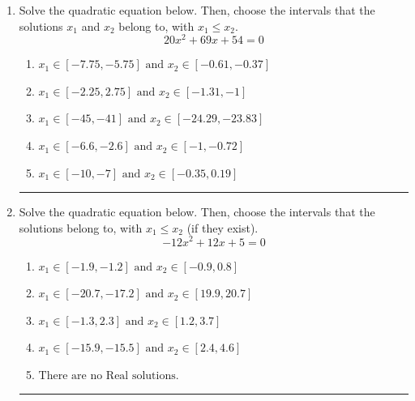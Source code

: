 \documentclass[14pt]{extbook}
\newcommand{\litem}[1]{\item#1\hspace*{-1cm}\rule{\textwidth}{0.4pt}}
\begin{document}
\begin{enumerate}
\litem{
Solve the quadratic equation below. Then, choose the intervals that the solutions $x_1$ and $x_2$ belong to, with $x_1 \leq x_2$.\[ 20x^{2} +69 x + 54 = 0 \]\begin{enumerate}[label=\Alph*.]
\item \( x_1 \in [-7.75, -5.75] \text{ and } x_2 \in [-0.61, -0.37] \)
\item \( x_1 \in [-2.25, 2.75] \text{ and } x_2 \in [-1.31, -1] \)
\item \( x_1 \in [-45, -41] \text{ and } x_2 \in [-24.29, -23.83] \)
\item \( x_1 \in [-6.6, -2.6] \text{ and } x_2 \in [-1, -0.72] \)
\item \( x_1 \in [-10, -7] \text{ and } x_2 \in [-0.35, 0.19] \)

\end{enumerate} }
\litem{
Solve the quadratic equation below. Then, choose the intervals that the solutions belong to, with $x_1 \leq x_2$ (if they exist).\[ -12x^{2} +12 x + 5 = 0 \]\begin{enumerate}[label=\Alph*.]
\item \( x_1 \in [-1.9, -1.2] \text{ and } x_2 \in [-0.9, 0.8] \)
\item \( x_1 \in [-20.7, -17.2] \text{ and } x_2 \in [19.9, 20.7] \)
\item \( x_1 \in [-1.3, 2.3] \text{ and } x_2 \in [1.2, 3.7] \)
\item \( x_1 \in [-15.9, -15.5] \text{ and } x_2 \in [2.4, 4.6] \)
\item \( \text{There are no Real solutions.} \)


\end{enumerate}}
\end{enumerate}
\end{document}
